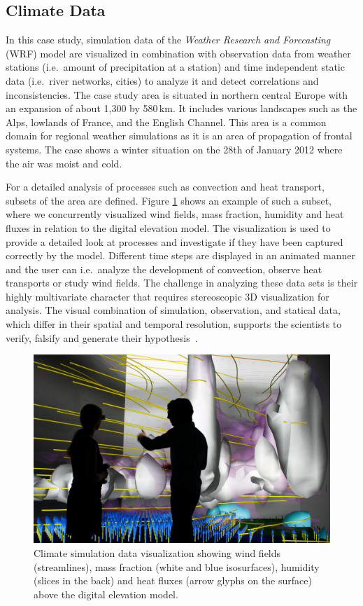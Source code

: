 \documentclass[twocolumn]{svjour3}          %
\begin{document}

\subsection{Climate Data}
\label{climate-data}

In this case study, simulation data of the \emph{Weather Research and Forecasting} (WRF) model are visualized in combination with observation data from weather stations (i.e.~amount of precipitation at a station) and time independent static data (i.e.~river networks, cities) to analyze it and detect correlations and inconsistencies. The case study area is situated in northern central Europe with an expansion of about 1,300 by 580\,km. It includes various landscapes such as the Alps, lowlands of France, and the English Channel. This area is a common domain for regional weather simulations as it is an area of propagation of frontal systems. The case shows a winter situation on the 28th of January 2012 where the air was moist and cold.

For a detailed analysis of processes such as convection and heat transport, subsets of the area are defined. Figure \ref{fig:wind} shows an example of such a subset, where we concurrently visualized wind fields, mass fraction, humidity and heat fluxes in relation to the digital elevation model. The visualization is used to provide a detailed look at processes and investigate if they have been captured correctly by the model. Different time steps are displayed in an animated manner and the user can i.e.~analyze the development of convection, observe heat transports or study wind fields. The challenge in analyzing these data sets is their highly multivariate character that requires stereoscopic 3D visualization for analysis. The visual combination of simulation, observation, and statical data, which differ in their spatial and temporal resolution, supports the scientists to verify, falsify and generate their hypothesis~\cite{helbig:eesenvirvis}.

\begin{figure}[htb]
  \includegraphics[width=\linewidth]{images/wind.jpg}
  \caption{Climate simulation data visualization showing wind fields (streamlines), mass fraction (white and blue isosurfaces), humidity (slices in the back) and heat fluxes (arrow glyphs on the surface) above the digital elevation model.}
\label{fig:wind}
\end{figure}
\end{document}
